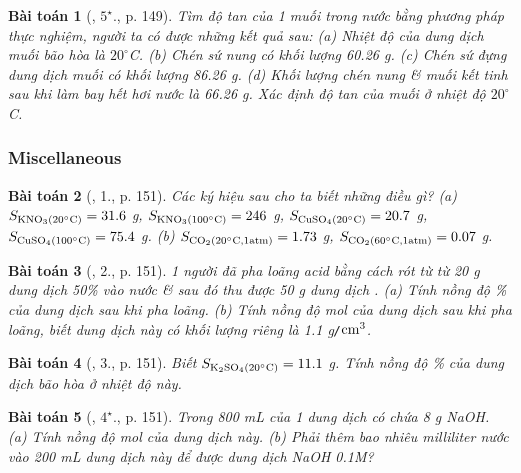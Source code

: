 \documentclass{article}
\newtheorem{baitoan}{Bài toán}
\begin{document}
\begin{baitoan}[\cite{SGK_Hoa_Hoc_8}, $5^\star$., p. 149]
	Tìm độ tan của 1 muối trong nước bằng phương pháp thực nghiệm, người ta có được những kết quả sau: (a) Nhiệt độ của dung dịch muối bão hòa là $20^\circ$\emph{C}. (b) Chén sứ nung có khối lượng \emph{60.26 g}. (c) Chén sứ đựng dung dịch muối có khối lượng \emph{86.26 g}. (d) Khối lượng chén nung \& muối kết tinh sau khi làm bay hết hơi nước là \emph{66.26 g}. Xác định độ tan của muối ở nhiệt độ $20^\circ$\emph{C}.
\end{baitoan}

\subsubsection{Miscellaneous}

\begin{baitoan}[\cite{SGK_Hoa_Hoc_8}, 1., p. 151]
	Các ký hiệu sau cho ta biết những điều gì? (a) $S_{\ce{KNO3}(\rm20^\circ C)} = 31.6$ \emph{g}, $S_{\ce{KNO3}(\rm100^\circ C)} = 246$ \emph{g}, $S_{\ce{CuSO4}(\rm20^\circ C)} = 20.7$ \emph{g}, $S_{\ce{CuSO4}(\rm100^\circ C)} = 75.4$ \emph{g}. (b) $S_{\ce{CO2}(\rm20^\circ C,1 atm)} = 1.73$ \emph{g}, $S_{\ce{CO2}(\rm60^\circ C,1 atm)} = 0.07$ \emph{g}.
\end{baitoan}

\begin{baitoan}[\cite{SGK_Hoa_Hoc_8}, 2., p. 151]
	1 người đã pha loãng acid bằng cách rót từ từ \emph{20 g} dung dịch \emph{ 50\%} vào nước \& sau đó thu được \emph{50 g} dung dịch \emph{}. (a) Tính nồng độ \% của dung dịch \emph{} sau khi pha loãng. (b) Tính nồng độ mol của dung dịch \emph{} sau khi pha loãng, biết dung dịch này có khối lượng riêng là \emph{1.1 g\texttt{/}$\rm cm^3$}.
\end{baitoan}

\begin{baitoan}[\cite{SGK_Hoa_Hoc_8}, 3., p. 151]
	Biết $S_{\ce{K2SO4}(\rm20^\circ C)} = 11.1$ \emph{g}. Tính nồng độ \% của dung dịch \emph{} bão hòa ở nhiệt độ này.
\end{baitoan}

\begin{baitoan}[\cite{SGK_Hoa_Hoc_8}, $4^\star$., p. 151]
	Trong \emph{800 mL} của 1 dung dịch có chứa \emph{8 g NaOH}. (a) Tính nồng độ mol của dung dịch này. (b) Phải thêm bao nhiêu milliliter nước vào \emph{200 mL} dung dịch này để được dung dịch \emph{NaOH 0.1M}?
\end{baitoan}
\end{document}
